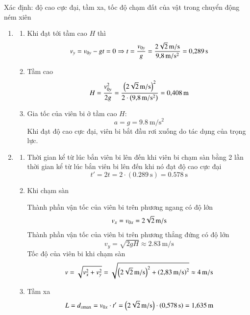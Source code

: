 \begin{dang}{Xác định: độ cao cực đại, tầm xa, tốc độ chạm đất của vật trong chuyển động ném xiên}
{{\begin{enumerate}[label=\arabic*.]
\begin{itemize}
\begin{itemize}
		\item Vận tốc của viên bi theo phương ngang:
		$$v_x=v_{0x}=\xsi{2\sqrt{2}}{\meter/\second}$$
		\item Vận tốc của viên bi theo phương thẳng đứng:
		$$v_y=v_{0y}-gt=\left(\xsi{2\sqrt{2}}{\meter/\second}\right)-\left(\SI{9.8}{\meter/\second^2}\right)\cdot\left(\SI{0.1}{\second}\right)=\SI{1.85}{\meter/\second}$$
	\end{itemize}
	\item Sau $\SI{0.2}{\second}$
	\begin{itemize}
		\item Vận tốc của viên bi theo phương ngang:
		$$v_x=v_{0x}=\xsi{2\sqrt{2}}{\meter/\second}$$
		\item Vận tốc của viên bi theo phương thẳng đứng:
		$$v_y=v_{0y}-gt=\left(\xsi{2\sqrt{2}}{\meter/\second}\right)-\left(\SI{9.8}{\meter/\second^2}\right)\cdot\left(\SI{0.2}{\second}\right)=\SI{0.87}{\meter/\second}$$
	\end{itemize}
	\end{itemize}
\item \begin{enumerate}[label=\alph*)]
	\item Khi đạt tới tầm cao $H$ thì 
	$$v_y=v_{0y}-gt=0\Rightarrow t=\dfrac{v_{0y}}{g}=\dfrac{\xsi{2\sqrt{2}}{\meter/\second}}{\SI{9.8}{\meter/\second^2}}=\SI{0.289}{\second}$$
	\item Tầm cao 
	$$H=\dfrac{v^2_{0y}}{2g}=\dfrac{\left(\xsi{2\sqrt{2}}{\meter/\second}\right)^2}{2\cdot\left(\SI{9.8}{\meter/\second^2}\right)}=\SI{0.408}{\meter}$$
	\item Gia tốc của viên bi ở tầm cao $H$:
	$$a=g=\SI{9.8}{\meter/\second^2}$$
	Khi đạt độ cao cực đại, viên bi bắt đầu rơi xuống do tác dụng của trọng lực.
\end{enumerate}
\item \begin{enumerate}[label=\alph*)]
	\item Thời gian kể từ lúc bắn viên bi lên đến khi viên bi chạm sàn bằng 2 lần thời gian kể từ lúc bắn viên bi lên đến khi nó đạt độ cao cực đại
	$$t'=2t=2\cdot\left(\SI{0.289}{\second}\right)=\SI{0.578}{\second}$$
	\item Khi chạm sàn
	
	Thành phần vận tốc của viên bi trên phương ngang có độ lớn
	$$v_x=v_{0x}=\xsi{2\sqrt{2}}{\meter
	/\second}$$
	Thành phần vận tốc của viên bi trên phương thẳng đứng có độ lớn
	$$v_y=\sqrt{2gH}\approx\SI{2.83}{\meter/\second}$$
	Tốc độ của viên bi khi chạm sàn
	$$v=\sqrt{v^2_x+v^2_y}=\sqrt{\left(\xsi{2\sqrt{2}}{\meter/\second}\right)^2+\left(\SI{2.83}{\meter/\second}\right)^2}\approx\SI{4}{\meter/\second}$$
	\item Tầm xa 
	$$L=d_{x \text{max}}=v_{0x}\cdot t'=\left(\xsi{2\sqrt{2}}{\meter/\second}\right)\cdot\left(\SI{0.578}{\second}\right)=\SI{1.635}{\meter}$$
\end{enumerate}
\end{enumerate}
}}
\end{dang}
